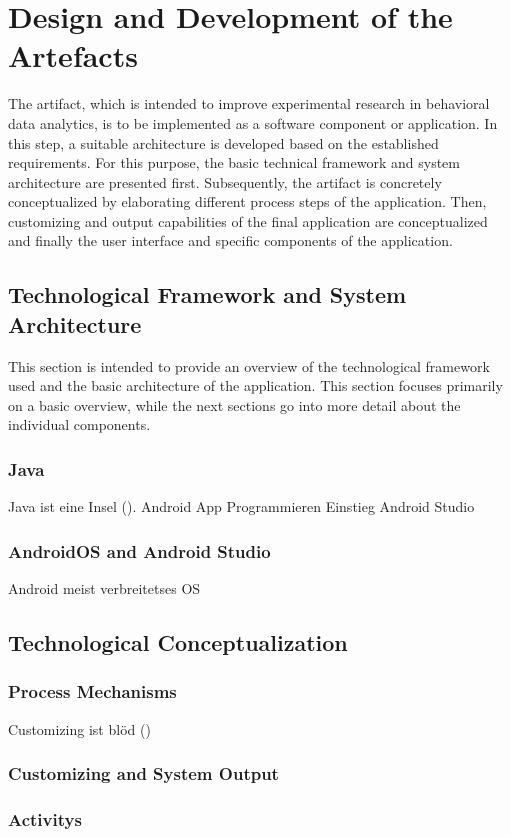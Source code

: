\newpage\section{Design and Development of the Artefacts}

The artifact, which is intended to improve experimental research in behavioral data analytics, is to be implemented as a software component or application. In this step, a suitable architecture is developed based on the established requirements. For this purpose, the basic technical framework and system architecture are presented first. Subsequently, the artifact is concretely conceptualized by elaborating different process steps of the application. Then, customizing and output capabilities of the final application are conceptualized and finally the user interface and specific components of the application.

\subsection{Technological Framework and System Architecture}

This section is intended to provide an overview of the technological framework used and the basic architecture of the application. This section focuses primarily on a basic overview, while the next sections go into more detail about the individual components.

\subsubsection{Java}

Java ist eine Insel (\cite{Ullenboom.2017}).
Android App Programmieren Einstieg Android Studio \cite{Richter.2019}

\subsubsection{AndroidOS and Android Studio}

Android meist verbreitetses OS \cite{statcounter.2023}


\subsection{Technological Conceptualization}

\subsubsection{Process Mechanisms}

Customizing ist blöd (\cite{Chou.2008})

\subsubsection{Customizing and System Output}

\subsubsection{Activitys}

